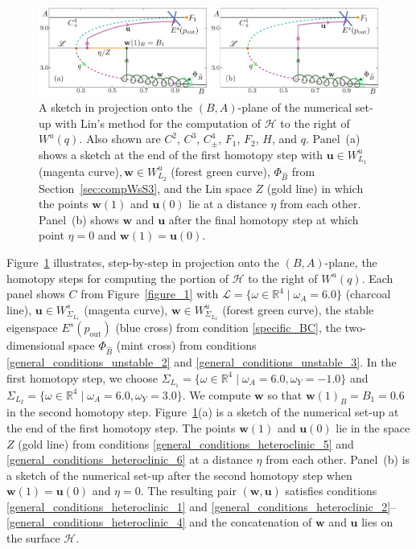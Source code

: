 \documentclass{ws-ijbc}
\begin{document}
\begin{figure}[t!]
\centering
\includegraphics[]{./figures/MKMO_10.pdf}
\caption{A sketch in projection onto the $(B,A)$-plane of the numerical set-up with Lin's method for the computation of $\mathscr{H}$ to the right of $W^u(q)$.  Also shown are $C^2$, $C^3$, $C^4_\pm$, $F_1$, $F_2$, $H$, and $q$.  Panel~(a) shows a sketch at the end of the first homotopy step with $\mathbf{u} \in W^u_{L_1}$ (magenta curve)$, \mathbf{w} \in W^u_{L_2}$ (forest green curve), $\Phi_{\widehat{B}}$ from Section~\ref{sec:compWsS3}, and the Lin space $Z$ (gold line) in which the points $\mathbf{w}(1)$ and $\mathbf{u}(0)$ lie at a distance $\eta$ from each other.  Panel~(b) shows $\mathbf{w}$ and $\mathbf{u}$ after the final homotopy step at which point $\eta=0$ and $\mathbf{w}(1)=\mathbf{u}(0)$.}
\label{figure_10}
\end{figure}

Figure~\ref{figure_10} illustrates, step-by-step in projection onto the $(B,A)$-plane, the homotopy steps for computing the portion of $\mathscr{H}$ to the right of $W^u(q)$.  
Each panel shows $C$ from Figure~\ref{figure_1} with $\mathscr{L} = \{ \omega \in \mathbb{R}^4 \; | \; \omega_A = 6.0 \}$ (charcoal line), $\mathbf{u} \in W^s_{\Sigma_{L_1}}$ (magenta curve), $\mathbf{w} \in W^u_{\Sigma_{L_2}}$ (forest green curve), the stable eigenspace $E^s(p_{\text{out}})$ (blue cross) from condition \eqref{specific_BC}, the two-dimensional space $\Phi_{\widehat{B}}$ (mint cross) from conditions \eqref{general_conditions_unstable_2} and \eqref{general_conditions_unstable_3}.  
In the first homotopy step, we choose $\Sigma_{L_1}=\{ \omega \in \mathbb{R}^4 \; | \; \omega_A = 6.0, \omega_Y=-1.0 \}$ and $\Sigma_{L_2}=\{ \omega \in \mathbb{R}^4 \; | \; \omega_A = 6.0, \omega_Y=3.0 \}$.  We compute $\mathbf{w}$ so that $\mathbf{w}(1)_B = B_1 = 0.6$ in the second homotopy step.  Figure~\ref{figure_10}(a) is a sketch of the numerical set-up at the end of the first homotopy step.  The points $\mathbf{w}(1)$ and $\mathbf{u}(0)$ lie in the space $Z$ (gold line) from conditions \eqref{general_conditions_heteroclinic_5} and \eqref{general_conditions_heteroclinic_6} at a distance $\eta$ from each other.  Panel~(b) is a sketch of the numerical set-up after the second homotopy step when $\mathbf{w}(1) = \mathbf{u}(0)$ and $\eta=0$.  The resulting pair $(\mathbf{w},\mathbf{u})$ satisfies conditions \eqref{general_conditions_heteroclinic_1} and \eqref{general_conditions_heteroclinic_2}--\eqref{general_conditions_heteroclinic_4} and the concatenation of $\mathbf{w}$ and $\mathbf{u}$ lies on the surface $\mathscr{H}$.
\end{document}
